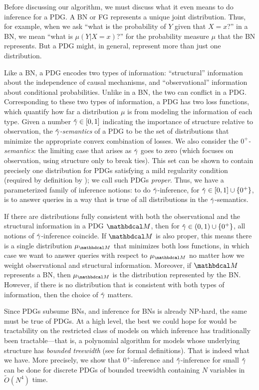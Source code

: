 Before discussing our algorithm, 
we must discuss what it even means to do inference for a PDG.  
A BN or FG represents 
a unique joint distribution. 
Thus, for example, when we ask ``what is the probability of $Y$ given that $X{=}x$?''
\def\BNPr{\mu}
in a BN, we mean ``what is $\BNPr(Y | X{=}x)$?'' for the probability 
measure $\BNPr$ that the BN represents.
But a PDG might, in general, represent more than just one distribution.

Like a BN, a PDG encodes
two types of information: ``structural'' 
information about the independence of causal mechanisms,
and ``observational'' information
about conditional probabilities.
Unlike in a BN, the two can conflict in a PDG.
Corresponding to these two types of information,
a PDG has two loss functions,
which quantify how far a distribution $\mu$ is from
modeling the information of each type.
Given a number $\zogamma
\in [0,1]
$
indicating the importance of structure relative to observation,
the \emph{$\zogamma$-semantics} of a PDG to be the
set of distributions that minimize 
the appropriate convex combination of
losses.
We also consider the \emph{$0^+$\!-semantics}: the limiting case that
arises as $\zogamma$ goes to zero
(which focuses
 on observation, using structure only to break ties).
This set
can be shown to contain precisely one distribution
for PDGs satisfying a mild regularity condition 
(required by definition by \citeauthor{pdg-aaai});
we call such PDGs \emph{proper}.
Thus, we have
 a parameterized family of inference notions:
to do $\zogamma$-inference, for $\zogamma \in [0,1] \cup \{0^+\}$,
is to answer queries in a way that is true of all distributions in the $\zogamma$-semantics.

If there are distributions
fully
consistent with
both the observational and the structural information
in a PDG $\dg M$, 
then for $\zogamma \in (0,1) \cup \{0^+\}$, all
notions of $\zogamma$-inference 
coincide.
\def\PrM{\mu_{\dg M}}%
If $\dg M$ is also proper,
    this means there is
    a single distribution $\PrM$
    that minimizes both loss functions, 
    in which case we want to answer queries with respect to $\PrM$
    no matter how we weight observational and structural information. 
Moreover, if $\dg M$ represents a BN,
then $\PrM$ is the distribution represented by the BN.  
However, if there is no distribution that is consistent with both types of information, then the choice of $\zogamma$ matters.  

Since PDGs subsume BNs, and inference for BNs is already NP-hard, the same must be true of PDGs.
At a high level, the best we could hope for would be tractability on the restricted
class of models on which inference has traditionally been tractable---that is, a polynomial algorithm for models whose
underlying structure has \emph{bounded treewidth} (see
 for formal definitions).
That is indeed what we have.  
More precisely, we show that
$0^+$\!-inference
and $\zogamma$-inference for small $\zogamma$ 
can be done 
for discrete PDGs of bounded treewidth containing $N$ variables in
$\tilde O(N^4)$ 
time.
 
